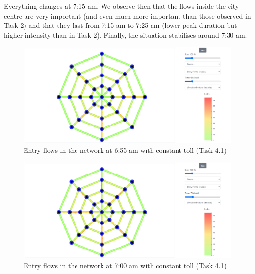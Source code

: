 \documentclass[a4paper, 12pt,oneside]{article}
\begin{document}
Everything changes at 7:15 am. We observe then that the flows inside the city centre are very important (and even much more important than those observed in Task 2) and that they last from 7:15 am to 7:25 am (lower peak duration but higher intensity than in Task 2). Finally, the situation stabilises around 7:30 am.\\

\begin{minipage}[c]{0.5\textwidth}
\begin{figure}[H]
    \centering
    \includegraphics[width=1\textwidth]{Images/Step4/results_on_network__task4.1_655am.png}
    \caption{Entry flows in the network at 6:55 am with constant toll (Task 4.1)}
    \label{fig:Entry flows in the network at 6:55 am with constant toll (Task 4.1)}
\end{figure}
\end{minipage}
\begin{minipage}[c]{0.5\textwidth}
\begin{figure}[H]
    \centering
    \includegraphics[width=1\textwidth]{Images/Step4/results_on_network__task4.1_700am.png}
    \caption{Entry flows in the network at 7:00 am with constant toll (Task 4.1)}
    \label{fig:Entry flows in the network at 7:00 am with constant toll (Task 4.1)}
\end{figure}
\end{minipage}
\end{document}
